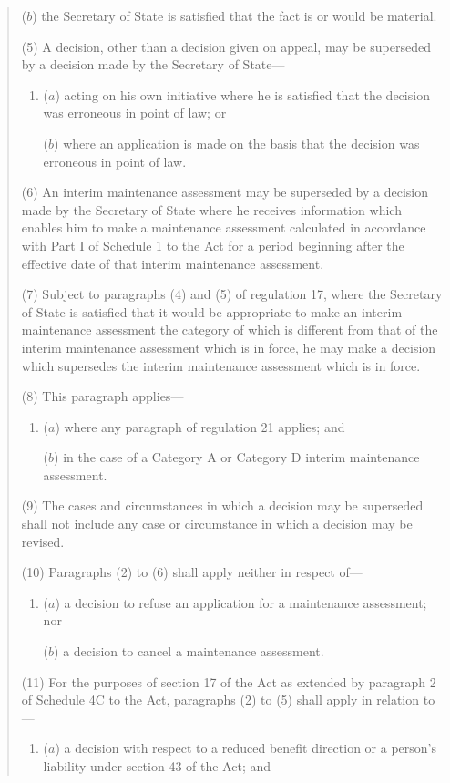 \documentclass[12pt,a4paper]{article}
\begin{document}
\begin{quotation}
\begin{enumerate}
($b$) the Secretary of State is satisfied that the fact is or would be material.
\end{enumerate}

(5) A decision, other than a decision given on appeal, may be superseded by a decision made by the Secretary of State---
\begin{enumerate}\item[]
($a$) acting on his own initiative where he is satisfied that the decision was erroneous in point of law; or

($b$) where an application is made on the basis that the decision was erroneous in point of law.
\end{enumerate}

(6) An interim maintenance assessment may be superseded by a decision made by the Secretary of State where he receives information which enables him to make a maintenance assessment calculated in accordance with Part I of Schedule 1 to the Act for a period beginning after the effective date of that interim maintenance assessment.

(7) Subject to paragraphs (4) and (5) of regulation 17, where the Secretary of State is satisfied that it would be appropriate to make an interim maintenance assessment the category of which is different from that of the interim maintenance assessment which is in force, he may make a decision which supersedes the interim maintenance assessment which is in force.

(8) This paragraph applies---
\begin{enumerate}\item[]
($a$) where any paragraph of regulation 21 applies; and

($b$) in the case of a Category A or Category D interim maintenance assessment.
\end{enumerate}

(9) The cases and circumstances in which a decision may be superseded shall not include any case or circumstance in which a decision may be revised.

(10) Paragraphs (2) to (6) shall apply neither in respect of---
\begin{enumerate}\item[]
($a$) a decision to refuse an application for a maintenance assessment; nor

($b$) a decision to cancel a maintenance assessment.
\end{enumerate}

(11) For the purposes of section 17 of the Act as extended by paragraph 2 of Schedule 4C to the Act, paragraphs (2) to (5) shall apply in relation to---
\begin{enumerate}\item[]
($a$) a decision with respect to a reduced benefit direction or a person’s liability under section 43 of the Act; and


\end{enumerate}
\end{quotation}
\end{document}

